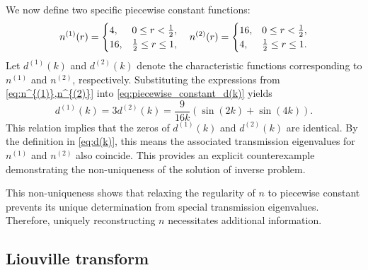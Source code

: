 \documentclass[11pt,reqno]{amsart}
\theoremstyle{definition}
\theoremstyle{remark}
\numberwithin{equation}{section}
\begin{document}
We now define two specific piecewise constant functions:	
\begin{equation}\label{eq:n^{(1)},n^{(2)}}
	n^{(1)}(r) = \begin{cases}
		4, & 0 \leq r < \frac{1}{2}, \\
		16, & \frac{1}{2} \leq r \leq 1,
	\end{cases}
	\quad
	n^{(2)}(r) = \begin{cases}
		16, & 0 \leq r < \frac{1}{2}, \\
		4, & \frac{1}{2} \leq r \leq 1.
	\end{cases}
\end{equation}
Let $d^{(1)}(k)$ and $d^{(2)}(k)$ denote the characteristic functions corresponding to $n^{(1)}$ and $n^{(2)}$, respectively. Substituting the expressions from \eqref{eq:n^{(1)},n^{(2)}} into \eqref{eq:piecewise_constant_d(k)} yields
\begin{equation*}
	d^{(1)}(k) = 3 d^{(2)}(k)  = \frac{9}{16k} (\sin(2k) + \sin(4k)).
\end{equation*}
This relation implies that the zeros of $d^{(1)}(k)$ and $d^{(2)}(k)$ are identical. By the definition in \eqref{eq:d(k)}, this means the associated transmission eigenvalues for $n^{(1)}$ and $n^{(2)}$ also coincide. This provides an explicit counterexample demonstrating the non-uniqueness of the solution of inverse problem.
	

This non-uniqueness shows that relaxing the regularity of $n$ to piecewise constant prevents its unique determination from special transmission eigenvalues. Therefore, uniquely reconstructing $n$ necessitates additional information.




\subsection{Liouville transform}\label{sec:Liouville transform}
\end{document}
